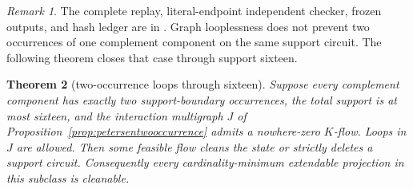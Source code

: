 \documentclass[11pt]{article}
\newtheorem{theorem}{Theorem}[section]
\theoremstyle{definition}
\theoremstyle{remark}
\newtheorem{remark}[theorem]{Remark}
\begin{document}
\begin{remark}
The complete replay, literal-endpoint independent checker, frozen outputs,
and hash ledger are in
.
Graph looplessness does not prevent two occurrences of one complement
component on the same support circuit.  The following theorem closes that
case through support sixteen.
\end{remark}

\begin{theorem}[two-occurrence loops through sixteen]
\label{thm:twooccurrenceloopsixteen}
Suppose every complement component has exactly two support-boundary
occurrences, the total support is at most sixteen, and the interaction
multigraph \(J\) of Proposition~\ref{prop:petersentwooccurrence} admits a
nowhere-zero \(K\)-flow.  Loops in \(J\) are allowed.  Then some feasible
flow cleans the state or strictly deletes a support circuit.
Consequently every cardinality-minimum extendable projection in this
subclass is cleanable.
\end{theorem}
\end{document}
